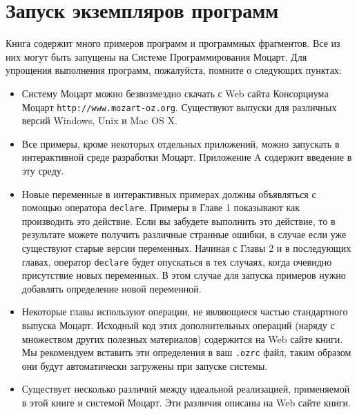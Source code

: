 \chapter*{Запуск экземпляров программ}

Книга содержит много примеров программ и программных фрагментов. Все из них могут быть запущены на Системе Программирования Моцарт. Для упрощения выполнения программ, пожалуйста, помните о следующих пунктах:

\begin{itemize}
\item{Систему Моцарт можно безвозмездно скачать с Web сайта Консорциума Моцарт \verb|http://www.mozart-oz.org|. Существуют выпуски для различных версий Windows, Unix и Mac OS X.}

\item{Все примеры, кроме некоторых отдельных приложений, можно запускать в интерактивной среде разработки Моцарт. Приложение A содержит введение в эту среду.}

\item{Новые переменные в интерактивных примерах должны объявляться с помощью оператора \lstinline!declare!. Примеры в Главе 1 показывают как производить это действие. Если вы забудете выполнить это действие, то в результате можете получить различные странные ошибки, в случае если уже существуют старые версии переменных. Начиная с Главы 2 и в последующих главах, оператор \lstinline!declare! будет опускаться в тех случаях, когда очевидно присутствие новых переменных. В этом случае для запуска примеров нужно добавлять определение новой переменной.}

\item{Некоторые главы используют операции, не являющиеся частью стандартного выпуска Моцарт. Исходный код этих дополнительных операций (наряду с множеством других полезных материалов) содержится на Web сайте книги. Мы рекомендуем вставить эти определения в ваш \verb|.ozrc| файл, таким образом они будут автоматически загружены при запуске системы.}

\item{Существует несколько различий между идеальной реализацией, применяемой в этой книге и системой Моцарт. Эти различия описаны на Web сайте книги.}
\end{itemize}
